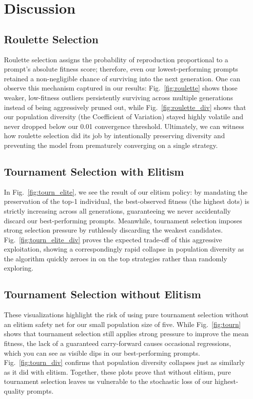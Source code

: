 \documentclass[conference]{IEEEtran}
\begin{document}
\section{Discussion}
\label{sec:discussion}

\subsection{Roulette Selection}

Roulette selection assigns the probability of reproduction proportional to a prompt's
absolute fitness score; therefore, even our lowest-performing prompts retained a
non-negligible chance of surviving into the next generation. One can observe this mechanism
captured in our results: Fig.~\ref{fig:roulette} shows those weaker, low-fitness outliers
persistently surviving across multiple generations instead of being aggressively pruned out,
while Fig.~\ref{fig:roulette_div} shows that our population diversity (the Coefficient of
Variation) stayed highly volatile and never dropped below our 0.01 convergence threshold.
Ultimately, we can witness how roulette selection did its job by intentionally preserving
diversity and preventing the model from prematurely converging on a single strategy.

\subsection{Tournament Selection with Elitism}

In Fig.~\ref{fig:tourn_elite}, we see the result of our elitism policy: by mandating the
preservation of the top-1 individual, the best-observed fitness (the highest dots) is
strictly increasing across all generations, guaranteeing we never accidentally discard our
best-performing prompts. Meanwhile, tournament selection imposes strong selection pressure
by ruthlessly discarding the weakest candidates. Fig.~\ref{fig:tourn_elite_div} proves the
expected trade-off of this aggressive exploitation, showing a correspondingly rapid collapse
in population diversity as the algorithm quickly zeroes in on the top strategies rather than
randomly exploring.

\subsection{Tournament Selection without Elitism}

These visualizations highlight the risk of using pure tournament selection without an
elitism safety net for our small population size of five. While Fig.~\ref{fig:tourn} shows
that tournament selection still applies strong pressure to improve the mean fitness, the
lack of a guaranteed carry-forward causes occasional regressions, which you can see as
visible dips in our best-performing prompts. Fig.~\ref{fig:tourn_div} confirms that
population diversity collapses just as similarly as it did with elitism. Together, these
plots prove that without elitism, pure tournament selection leaves us vulnerable to the
stochastic loss of our highest-quality prompts.
\end{document}
